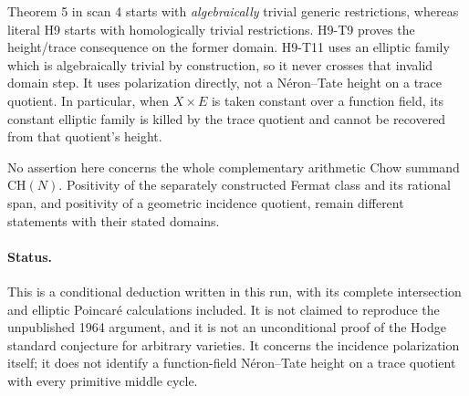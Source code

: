Theorem 5 in scan 4 starts with \emph{algebraically} trivial generic
restrictions, whereas literal H9 starts with homologically trivial
restrictions. H9-T9 proves the height/trace consequence on the former
domain. H9-T11 uses an elliptic family which is algebraically trivial
by construction, so it never crosses that invalid domain step.
It uses polarization directly, not a N\'eron--Tate height on a trace
quotient. In particular, when $X\times E$ is taken constant over a
function field, its constant elliptic family is killed by the trace
quotient and cannot be recovered from that quotient's height.

No assertion here concerns the whole complementary arithmetic Chow
summand $\mathrm{CH}(N)$. Positivity of the separately constructed
Fermat class and its rational span, and positivity of a geometric
incidence quotient, remain different statements with their stated
domains.

\paragraph{Status.}
This is a conditional deduction written in this run, with its complete
intersection and elliptic Poincar\'e calculations included. It is not
claimed to reproduce the unpublished 1964 argument, and it is not an
unconditional proof of the Hodge standard conjecture for arbitrary
varieties. It concerns the incidence polarization itself; it does not
identify a function-field N\'eron--Tate height on a trace quotient with
every primitive middle cycle.

